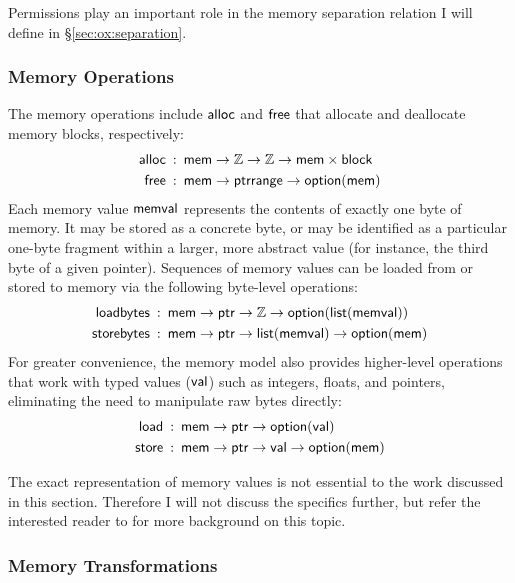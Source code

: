 Permissions play an important role
in the memory separation relation I will define in \S\ref{sec:ox:separation}.

\subsubsection{Memory Operations}

The memory operations include
$ \mathsf{alloc} $ and $ \mathsf{free} $
that allocate and deallocate memory blocks, respectively:
\begin{align*}
   \mathsf{alloc}  & \::\:  \mathsf{mem} 
  \rightarrow \mathbb{Z}
  \rightarrow \mathbb{Z}
  \rightarrow  \mathsf{mem}  \times  \mathsf{block} \\
   \mathsf{free}  & \::\:  \mathsf{mem} 
  \rightarrow  \mathsf{ptrrange} 
  \rightarrow  \mathsf{option} ( \mathsf{mem} )
\end{align*}
Each memory value $ \mathsf{memval} $ represents the contents of exactly one byte of memory.
It may be stored as a concrete byte,
or may be identified as a particular one-byte fragment
within a larger, more abstract value
(for instance, the third byte of a given pointer).
Sequences of memory values can be loaded from or stored to memory via the following byte-level operations:
\begin{align*}
   \mathsf{loadbytes}  & \::\:  \mathsf{mem} 
  \rightarrow  \mathsf{ptr} 
  \rightarrow \mathbb{Z}
  \rightarrow  \mathsf{option} ( \mathsf{list} ( \mathsf{memval} ))\\
   \mathsf{storebytes}  & \::\:  \mathsf{mem} 
  \rightarrow  \mathsf{ptr} 
  \rightarrow  \mathsf{list} ( \mathsf{memval} )
  \rightarrow  \mathsf{option} ( \mathsf{mem} )\\
\end{align*}
For greater convenience,
the memory model also provides
higher-level operations
that work with typed values ($ \mathsf{val} $)
such as integers, floats, and pointers,
eliminating the need to manipulate raw bytes directly:
\begin{align*}
   \mathsf{load}  & \::\:  \mathsf{mem} 
  \rightarrow  \mathsf{ptr} 
  \rightarrow  \mathsf{option} ( \mathsf{val} )\\
   \mathsf{store}  & \::\:  \mathsf{mem} 
  \rightarrow  \mathsf{ptr} 
  \rightarrow  \mathsf{val} 
  \rightarrow  \mathsf{option} ( \mathsf{mem} )
\end{align*}

The exact representation of memory values
is not essential to the work discussed in this section.
Therefore
I will not discuss the specifics further,
but refer the interested reader to \citet{compcertmmv2}
for more background on this topic.

\subsubsection{Memory Transformations}

